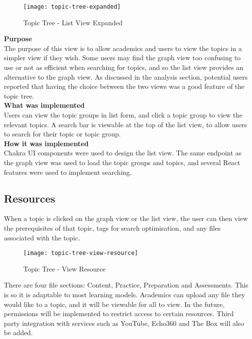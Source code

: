 \begin{figure}[h!]
    \centering
    \texttt{[image: topic-tree-expanded]}
    \caption{Topic Tree - List View Expanded}
\end{figure}

\textbf{Purpose} \\
The purpose of this view is to allow academics and users to view the topics in a simpler view if they wish. Some users may find the graph view too confusing to use or not as efficient when searching for topics, and so the list view provides an alternative to the graph view. As discussed in the analysis section, potential users reported that having the choice between the two views was a good feature of the topic tree.\\

\textbf{What was implemented} \\
Users can view the topic groups in list form, and click a topic group to view the relevant topics. A search bar is viewable at the top of the list view, to allow users to search for their topic or topic group.\\

\textbf{How it was implemented} \\
Chakra UI components were used to design the list view. The same endpoint as the graph view was used to load the topic groups and topics, and several React features were used to implement searching.

\subsection{Resources}

When a topic is clicked on the graph view or the list view, the user can then view the prerequisites of that topic, tags for search optimisation, and any files associated with the topic.

\begin{figure}[h!]
    \centering
    \texttt{[image: topic-tree-view-resource]}
    \caption{Topic Tree - View Resource}
\end{figure}

There are four file sections: Content, Practice, Preparation and Assessments. This is so it is adaptable to most learning models. Academics can upload any file they would like to a topic, and it will be viewable for all to view. In the future, permissions will be implemented to restrict access to certain resources. Third party integration with services such as YouTube, Echo360 and The Box will also be added.\\

